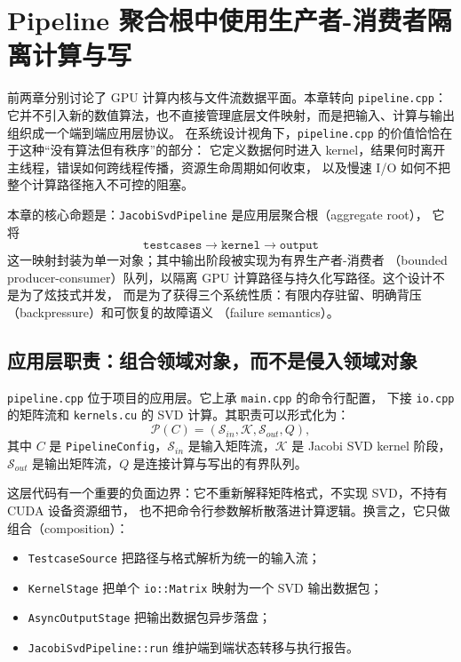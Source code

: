 \section{Pipeline 聚合根中使用生产者-消费者隔离计算与写}

前两章分别讨论了 GPU 计算内核与文件流数据平面。本章转向 \texttt{pipeline.cpp}：
它并不引入新的数值算法，也不直接管理底层文件映射，而是把输入、计算与输出组织成一个端到端应用层协议。
在系统设计视角下，\texttt{pipeline.cpp} 的价值恰恰在于这种“没有算法但有秩序”的部分：
它定义数据何时进入 kernel，结果何时离开主线程，错误如何跨线程传播，资源生命周期如何收束，
以及慢速 I/O 如何不把整个计算路径拖入不可控的阻塞。

本章的核心命题是：\texttt{JacobiSvdPipeline} 是应用层聚合根（aggregate root），
它将
\[
    \texttt{testcases}
    \longrightarrow
    \texttt{kernel}
    \longrightarrow
    \texttt{output}
\]
这一映射封装为单一对象；其中输出阶段被实现为有界生产者-消费者
（bounded producer-consumer）队列，以隔离 GPU 计算路径与持久化写路径。这个设计不是为了炫技式并发，
而是为了获得三个系统性质：有限内存驻留、明确背压（backpressure）和可恢复的故障语义
（failure semantics）。

\subsection{应用层职责：组合领域对象，而不是侵入领域对象}

\texttt{pipeline.cpp} 位于项目的应用层。它上承 \texttt{main.cpp} 的命令行配置，
下接 \texttt{io.cpp} 的矩阵流和 \texttt{kernels.cu} 的 SVD 计算。其职责可以形式化为：
\[
    \mathcal{P}(C)
    =
    \left(
        \mathcal{S}_{in},
        \mathcal{K},
        \mathcal{S}_{out},
        Q
    \right),
\]
其中 $C$ 是 \texttt{PipelineConfig}，$\mathcal{S}_{in}$ 是输入矩阵流，$\mathcal{K}$
是 Jacobi SVD kernel 阶段，$\mathcal{S}_{out}$ 是输出矩阵流，$Q$ 是连接计算与写出的有界队列。

这层代码有一个重要的负面边界：它不重新解释矩阵格式，不实现 SVD，不持有 CUDA 设备资源细节，
也不把命令行参数解析散落进计算逻辑。换言之，它只做组合（composition）：

\begin{itemize}
    \item \texttt{TestcaseSource} 把路径与格式解析为统一的输入流；
    \item \texttt{KernelStage} 把单个 \texttt{io::Matrix} 映射为一个 SVD 输出数据包；
    \item \texttt{AsyncOutputStage} 把输出数据包异步落盘；
    \item \texttt{JacobiSvdPipeline::run} 维护端到端状态转移与执行报告。
\end{itemize}

